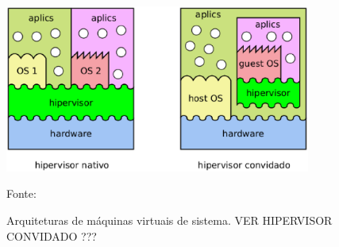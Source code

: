 \begin{figure}[vms_arquiteturas]
 \centering
 \includegraphics[width=380px]{img/vms_arquiteturas.eps}
 \caption{Arquiteturas de máquinas virtuais de sistema. VER HIPERVISOR CONVIDADO ???}
 \label{fig:vms_arquiteturas}
 Fonte: \citet{maziero2013}
\end{figure}



